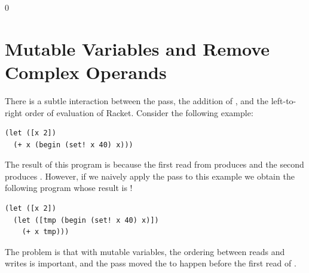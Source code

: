 \documentclass[7x10]{TimesAPriori_MIT}%
\def\racketEd{0}
\def\edition{0}
\numberwithin{theorem}{chapter}
\numberwithin{definition}{chapter}
\numberwithin{equation}{chapter}
\begin{document}
{\if\edition\racketEd
\section{Mutable Variables and Remove Complex Operands}

There is a subtle interaction between the
 pass, the addition of ,
and the left-to-right order of evaluation of Racket. Consider the
following example:
\begin{lstlisting}
(let ([x 2])
  (+ x (begin (set! x 40) x)))
\end{lstlisting}
The result of this program is  because the first read from
 produces  and the second produces . However,
if we naively apply the  pass to this
example we obtain the following program whose result is !
\begin{lstlisting}
(let ([x 2])
  (let ([tmp (begin (set! x 40) x)])
    (+ x tmp)))
\end{lstlisting}
The problem is that with mutable variables, the ordering between
reads and writes is important, and the
 pass moved the  to happen
before the first read of .

}
\end{document}
